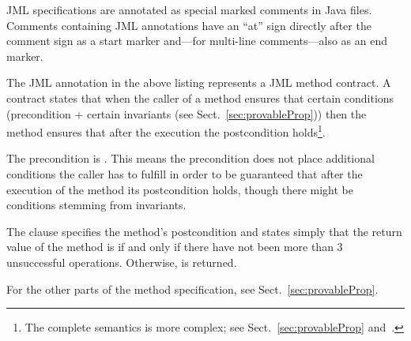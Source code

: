 JML specifications are annotated as special marked
comments in Java files. Comments containing JML
annotations have an ``at'' sign directly after the comment sign as a start
marker and---for multi-line comments---also as an end marker.

The JML annotation in the above listing represents a JML method
contract. A contract states that when the caller of a method ensures
that certain conditions (precondition + certain invariants (see
Sect.~\ref{sec:provableProp})) then the method ensures that after the
execution the postcondition holds\footnote{The complete semantics is
  more complex; see Sect.~\ref{sec:provableProp}
  and~\cite{JMLReferenceManual11}.}.

The precondition is . This means the precondition does not
place additional conditions the caller has to fulfill in order to be
guaranteed that after the execution of the method its postcondition
holds, though there might be conditions stemming from invariants.

The  clause specifies the method's postcondition and
states simply that the return value of the method is  if and
only if there have not been more than 3 unsuccessful
operations. Otherwise,  is returned.

For the other parts of the method specification, see
Sect.~\ref{sec:provableProp}.


